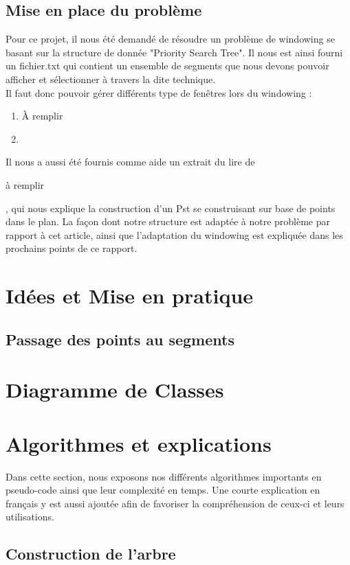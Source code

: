 \documentclass[10pt,a4paper]{article}
\begin{document}
\subsection{Mise en place du problème}
Pour ce projet, il nous été demandé de résoudre un problème de windowing se basant sur la structure de donnée "Priority Search Tree". Il nous est ainsi fourni un fichier.txt qui contient un ensemble de segments que nous devons pouvoir afficher et sélectionner à travers la dite technique. \\
Il faut donc pouvoir gérer différents type de fenêtres lors du windowing :
\begin{enumerate}
	\item \begin{Huge}
	À remplir
	\end{Huge}
	\item 
	
\end{enumerate}
Il nous a aussi été fournis comme aide un extrait du lire de \begin{Huge}
à remplir
\end{Huge}
, qui nous explique la construction d'un Pst se construisant sur base de points dans le plan. La façon dont notre structure est adaptée à notre problème par rapport à cet article, ainsi que l'adaptation du windowing est expliquée dans les prochains points de ce rapport. 

\section{Idées et Mise en pratique}
\subsection{Passage des points au segments}

\section{Diagramme de Classes}

\section{Algorithmes et explications}
Dans cette section, nous exposons nos différents algorithmes importants en pseudo-code ainsi que leur complexité en temps. Une courte explication en français y est aussi ajoutée afin de favoriser la compréhension de ceux-ci et leurs utilisations.
\subsection{Construction de l'arbre}
\end{document}

